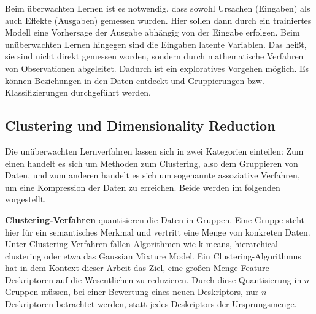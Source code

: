 Beim überwachten Lernen ist es notwendig, dass sowohl Ursachen (Eingaben) als auch Effekte (Ausgaben) gemessen wurden. Hier sollen dann durch ein trainiertes Modell eine Vorhersage der Ausgabe abhängig von der Eingabe erfolgen. Beim unüberwachten Lernen hingegen sind die Eingaben latente Variablen. Das heißt, sie sind nicht direkt gemessen worden, sondern durch mathematische Verfahren von Observationen abgeleitet. Dadurch ist ein exploratives Vorgehen möglich. Es können Beziehungen in den Daten entdeckt und Gruppierungen bzw. Klassifizierungen durchgeführt werden.

\subsection{Clustering und Dimensionality Reduction}

Die unüberwachten Lernverfahren lassen sich in zwei Kategorien einteilen: Zum einen handelt es sich um Methoden zum Clustering, also dem Gruppieren von Daten, und zum anderen handelt es sich um sogenannte assoziative Verfahren, um eine Kompression der Daten zu erreichen. Beide werden im folgenden vorgestellt.\newline

\textbf{Clustering-Verfahren} quantisieren die Daten in Gruppen. Eine Gruppe steht hier für ein semantisches Merkmal und vertritt eine Menge von konkreten Daten. Unter Clustering-Verfahren fallen Algorithmen wie k-means, hierarchical clustering oder etwa das Gaussian Mixture Model.\newline
Ein Clustering-Algorithmus hat in dem Kontext dieser Arbeit das Ziel, eine großen Menge Feature-Deskriptoren auf die Wesentlichen zu reduzieren. Durch diese Quantisierung in $n$ Gruppen müssen, bei einer Bewertung eines neuen Deskriptors, nur $n$ Deskriptoren betrachtet werden, statt jedes Deskriptors der Ursprungsmenge.\newline

